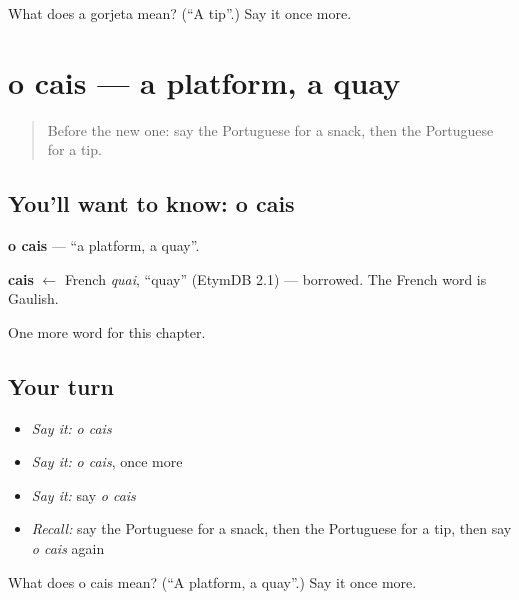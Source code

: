 \begin{tcolorbox}[breakable,colback=teal!4,colframe=teal!35!black,title={Before you move on}]
What does a gorjeta mean? (\textquotedblleft{}A tip\textquotedblright{}.) Say it once more.
\end{tcolorbox}
\section[o cais]{o cais — a platform, a quay}

\label{lesson:PT-C218-cais}



\begin{quote}
Before the new one: say the Portuguese for a snack, then the Portuguese for a tip.
\end{quote}

\subsection*{You'll want to know: o cais}
\textbf{o cais} — \textquotedblleft{}a platform, a quay\textquotedblright{}.

\begin{cousinweb}
\textbf{cais} $\leftarrow$ French \emph{quai}, \textquotedblleft{}quay\textquotedblright{} (EtymDB 2.1) — borrowed. The French word is Gaulish.
\end{cousinweb}

\begin{grammarlens}[title={What you've built}]
One more word for this chapter.
\end{grammarlens}

\subsection*{Your turn}
\begin{itemize}
\raggedright
  \item \emph{Say it:} \emph{o cais}
  \item \emph{Say it:} \emph{o cais}, once more
  \item \emph{Say it:} say \emph{o cais}
  \item \emph{Recall:} say the Portuguese for a snack, then the Portuguese for a tip, then say \emph{o cais} again
\end{itemize}

\begin{tcolorbox}[breakable,colback=teal!4,colframe=teal!35!black,title={Before you move on}]
What does o cais mean? (\textquotedblleft{}A platform, a quay\textquotedblright{}.) Say it once more.
\end{tcolorbox}
